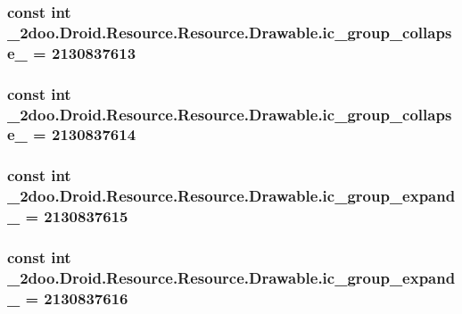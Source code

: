 \hypertarget{class__2doo_1_1_droid_1_1_resource_1_1_drawable_6d840ae2d627ac671369c3266135f12e}{
\subsubsection[{ic\_\-group\_\-collapse\_\-14}]{\setlength{\rightskip}{0pt plus 5cm}const int \_\-2doo.Droid.Resource.Resource.Drawable.ic\_\-group\_\-collapse\_ = 2130837613}}
\label{class__2doo_1_1_droid_1_1_resource_1_1_drawable_6d840ae2d627ac671369c3266135f12e}


\hypertarget{class__2doo_1_1_droid_1_1_resource_1_1_drawable_c968bfcf3261aa393b0bd1c4ad8a9ccc}{
\subsubsection[{ic\_\-group\_\-collapse\_\-15}]{\setlength{\rightskip}{0pt plus 5cm}const int \_\-2doo.Droid.Resource.Resource.Drawable.ic\_\-group\_\-collapse\_ = 2130837614}}
\label{class__2doo_1_1_droid_1_1_resource_1_1_drawable_c968bfcf3261aa393b0bd1c4ad8a9ccc}


\hypertarget{class__2doo_1_1_droid_1_1_resource_1_1_drawable_ec774712ed2240f3f8b33ded84c2cdd2}{
\subsubsection[{ic\_\-group\_\-expand\_\-00}]{\setlength{\rightskip}{0pt plus 5cm}const int \_\-2doo.Droid.Resource.Resource.Drawable.ic\_\-group\_\-expand\_ = 2130837615}}
\label{class__2doo_1_1_droid_1_1_resource_1_1_drawable_ec774712ed2240f3f8b33ded84c2cdd2}


\hypertarget{class__2doo_1_1_droid_1_1_resource_1_1_drawable_2f90bca1cea45dff6f39667237d8e293}{
\subsubsection[{ic\_\-group\_\-expand\_\-01}]{\setlength{\rightskip}{0pt plus 5cm}const int \_\-2doo.Droid.Resource.Resource.Drawable.ic\_\-group\_\-expand\_ = 2130837616}}
\label{class__2doo_1_1_droid_1_1_resource_1_1_drawable_2f90bca1cea45dff6f39667237d8e293}


